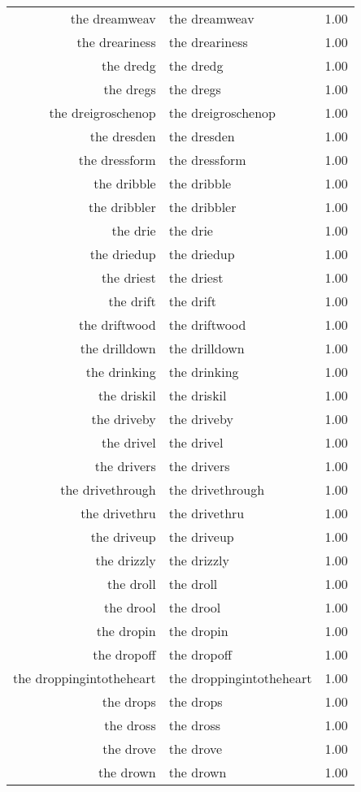 \begin{table}[ht]
\begin{tabular}{rlr}
  the dreamweav & the dreamweav & 1.00 \\ 
  the dreariness & the dreariness & 1.00 \\ 
  the dredg & the dredg & 1.00 \\ 
  the dregs & the dregs & 1.00 \\ 
  the dreigroschenop & the dreigroschenop & 1.00 \\ 
  the dresden & the dresden & 1.00 \\ 
  the dressform & the dressform & 1.00 \\ 
  the dribble & the dribble & 1.00 \\ 
  the dribbler & the dribbler & 1.00 \\ 
  the drie & the drie & 1.00 \\ 
  the driedup & the driedup & 1.00 \\ 
  the driest & the driest & 1.00 \\ 
  the drift & the drift & 1.00 \\ 
  the driftwood & the driftwood & 1.00 \\ 
  the drilldown & the drilldown & 1.00 \\ 
  the drinking & the drinking & 1.00 \\ 
  the driskil & the driskil & 1.00 \\ 
  the driveby & the driveby & 1.00 \\ 
  the drivel & the drivel & 1.00 \\ 
  the drivers & the drivers & 1.00 \\ 
  the drivethrough & the drivethrough & 1.00 \\ 
  the drivethru & the drivethru & 1.00 \\ 
  the driveup & the driveup & 1.00 \\ 
  the drizzly & the drizzly & 1.00 \\ 
  the droll & the droll & 1.00 \\ 
  the drool & the drool & 1.00 \\ 
  the dropin & the dropin & 1.00 \\ 
  the dropoff & the dropoff & 1.00 \\ 
  the droppingintotheheart & the droppingintotheheart & 1.00 \\ 
  the drops & the drops & 1.00 \\ 
  the dross & the dross & 1.00 \\ 
  the drove & the drove & 1.00 \\ 
  the drown & the drown & 1.00 \\ 

\end{tabular}
\end{table}
